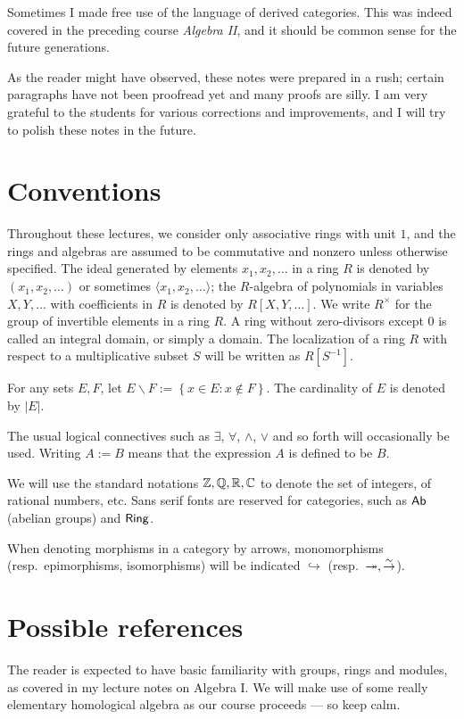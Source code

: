 Sometimes I made free use of the language of derived categories. This was indeed covered in the preceding course \emph{Algebra II}, and it should be common sense for the future generations.

As the reader might have observed, these notes were prepared in a rush; certain paragraphs have not been proofread yet and many proofs are silly. I am very grateful to the students for various corrections and improvements, and I will try to polish these notes in the future.

\section*{Conventions}
Throughout these lectures, we consider only associative rings with unit $1$, and the rings and algebras are assumed to be commutative and nonzero unless otherwise specified. The ideal generated by elements $x_1, x_2, \ldots$ in a ring $R$ is denoted by $(x_1, x_2, \ldots)$ or sometimes $\langle x_1, x_2, \ldots \rangle$; the $R$-algebra of polynomials in variables $X, Y, \ldots$ with coefficients in $R$ is denoted by $R[X, Y, \ldots]$. We write $R^\times$ for the group of invertible elements in a ring $R$. A ring without zero-divisors except $0$ is called an integral domain, or simply a domain. The localization of a ring $R$ with respect to a multiplicative subset $S$ will be written as $R[S^{-1}]$.

For any sets $E, F$, let $E \smallsetminus F := \left\{ x \in E: x \notin F \right\}$. The cardinality of $E$ is denoted by $|E|$.

The usual logical connectives such as $\exists$, $\forall$, $\wedge$, $\vee$ and so forth will occasionally be used. Writing $A := B$ means that the expression $A$ is defined to be $B$.

We will use the standard notations $\mathbb{Z}, \mathbb{Q}, \mathbb{R}, \mathbb{C}$ to denote the set of integers, of rational numbers, etc. Sans serif fonts are reserved for categories, such as $\mathsf{Ab}$ (abelian groups) and $\mathsf{Ring}$. 

When denoting morphisms in a category by arrows, monomorphisms (resp.\ epimorphisms, isomorphisms) will be indicated $\hookrightarrow$ (resp.\ $\twoheadrightarrow, \stackrel{\sim}{\rightarrow}$).

\section*{Possible references}
The reader is expected to have basic familiarity with groups, rings and modules, as covered in my lecture notes on Algebra I. We will make use of some really elementary homological algebra as our course proceeds --- so keep calm.

